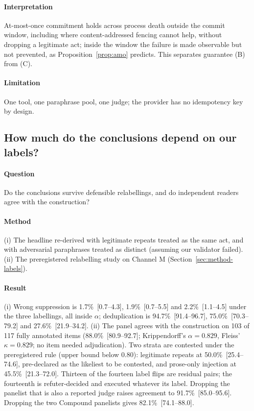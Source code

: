 \paragraph{Interpretation} At-most-once commitment holds across process death outside the commit window, including where content-addressed fencing cannot help, without dropping a legitimate act; inside the window the failure is made observable but not prevented, as Proposition~\ref{prop:amo} predicts. This separates guarantee (B) from (C).

\paragraph{Limitation} One tool, one paraphrase pool, one judge; the provider has no idempotency key by design.

\subsection{How much do the conclusions depend on our labels?}\label{sec:res-labels}

\paragraph{Question} Do the conclusions survive defensible relabellings, and do independent readers agree with the construction?

\paragraph{Method} (i) The headline re-derived with legitimate repeats treated as the same act, and with adversarial paraphrases treated as distinct (assuming our validator failed). (ii) The preregistered relabelling study on Channel M (Section~\ref{sec:method-labels}).

\paragraph{Result} (i) Wrong suppression is 1.7\%~[0.7--4.3], 1.9\%~[0.7--5.5] and 2.2\%~[1.1--4.5] under the three labellings, all inside $\alpha$; deduplication is 94.7\%~[91.4--96.7], 75.0\%~[70.3--79.2] and 27.6\%~[21.9--34.2]. (ii) The panel agrees with the construction on 103 of 117 fully annotated items (88.0\%~[80.9--92.7]; Krippendorff's $\alpha=0.829$, Fleiss' $\kappa=0.829$; no item needed adjudication). Two strata are contested under the preregistered rule (upper bound below 0.80): legitimate repeats at 50.0\%~[25.4--74.6], pre-declared as the likeliest to be contested, and prose-only injection at 45.5\%~[21.3--72.0]. Thirteen of the fourteen label flips are residual pairs; the fourteenth is refuter-decided and executed whatever its label. Dropping the panelist that is also a reported judge raises agreement to 91.7\%~[85.0--95.6]. Dropping the two Compound panelists gives 82.1\%~[74.1--88.0].

